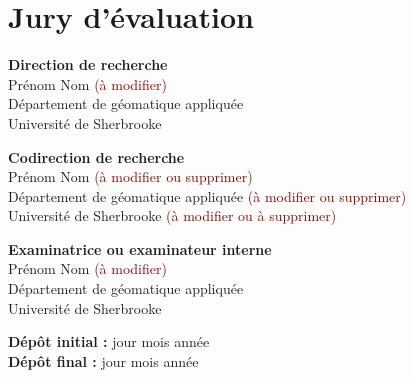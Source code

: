 \chapter*{Jury d’évaluation}
\thispagestyle{empty}


\textbf{Direction de recherche} \\ 
Prénom Nom \textcolor{darkred}{(à modifier)} \\
Département de géomatique appliquée \\
Université de Sherbrooke 
\vspace{0.5cm}

\textbf{Codirection de recherche} \\ 
Prénom Nom \textcolor{darkred}{(à modifier ou supprimer)} \\
Département de géomatique appliquée \textcolor{darkred}{(à modifier ou supprimer)} \\
Université de Sherbrooke \textcolor{darkred}{(à modifier ou à supprimer)}
\vspace{0.5cm}

\textbf{Examinatrice ou examinateur interne} \\
Prénom Nom \textcolor{darkred}{(à modifier)} \\
Département de géomatique appliquée \\
Université de Sherbrooke
\vspace{2cm}

\vfill

\begin{center}
\textbf{Dépôt initial :} jour mois année \\
\textbf{Dépôt final :} jour mois année
\end{center}

\newpage
